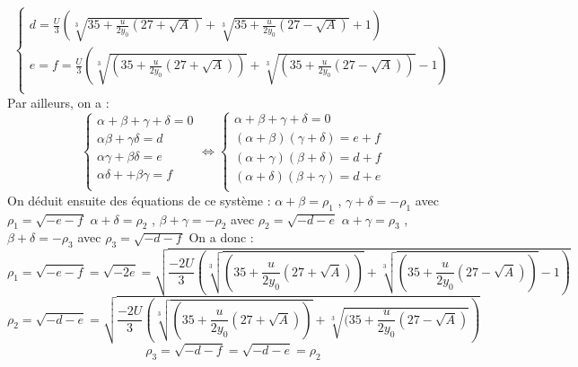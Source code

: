\documentclass[12pt]{article}
\begin{document}
\begin{equation}
\left\{ \begin{array}{rl}
d = \frac{U}{3} ( \sqrt[3]{35+\frac{u}{2y_0}(27 + \sqrt{A})}+\sqrt[3]{35+\frac{u}{2y_0}(27 - \sqrt{A})} + 1)\\
e = f = \frac{U}{3} (\sqrt[3]{(35+\frac{u}{2y_0}(27 + \sqrt{A}))} + \sqrt[3]{(35+\frac{u}{2y_0}(27 - \sqrt{A}))} -1 )\\
\end{array} \right.
\end{equation}
Par ailleurs, on a :
\begin{equation}
\left\{ \begin{array}{rl}
\alpha + \beta + \gamma + \delta = 0 \\
\alpha \beta + \gamma \delta = d \\
\alpha \gamma + \beta \delta = e \\
\alpha \delta + + \beta \gamma = f \\
\end{array} \right.
\Longleftrightarrow
\left\{ \begin{array}{rl}
\alpha + \beta + \gamma + \delta = 0 \\
(\alpha + \beta )( \gamma + \delta ) = e+f \\
(\alpha + \gamma)( \beta + \delta) = d +f \\
(\alpha  + \delta)( \beta + \gamma) = d+e \\
\end{array} \right.
\end{equation}
On d\'eduit ensuite des \'equations de ce syst\`eme :
\newline
$\alpha + \beta = \rho_1$ , $\gamma + \delta = -\rho_1 $ avec $\rho_1 = \sqrt{-e-f} $
\newline
$\alpha + \delta = \rho_2$ , $\beta + \gamma = -\rho_2$ avec $\rho_2 = \sqrt{-d -e}$
\newline
$\alpha + \gamma = \rho_3$ , $\beta + \delta = -\rho_3$ avec $\rho_3 = \sqrt{-d-f}$ 
On a donc : 
\begin{equation}
 \rho_1 = \sqrt{-e-f} = \sqrt{-2e} = \sqrt{\frac{-2U}{3} (\sqrt[3]{(35+\frac{u}{2y_0}(27 + \sqrt{A}))} + \sqrt[3]{(35+\frac{u}{2y_0}(27 - \sqrt{A}))} -1 )}
\end{equation}
\begin{equation}
 \rho_2 = \sqrt{-d-e} = \sqrt{\frac{-2U}{3} (\sqrt[3]{(35+\frac{u}{2y_0}(27 + \sqrt{A}))} + \sqrt[3]{(35+\frac{u}{2y_0}(27 - \sqrt{A})})}
\end{equation}
\begin{equation}
 \rho_3 = \sqrt{-d-f} = \sqrt{-d-e} = \rho_2
\end{equation}
\end{document}
